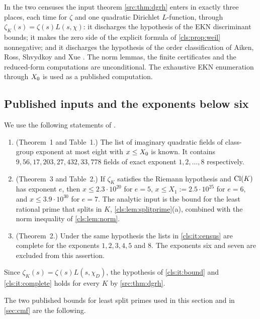 In the two censuses the input theorem \cref{src:thm:dgrh} enters in exactly three places,
each time for $\zeta$ and one quadratic Dirichlet $L$-function, through
$\zeta_K(s)=\zeta(s)L(s,\chi)$:
it discharges the hypothesis of the EKN discriminant bounds; it makes the zero side of the
explicit formula of \cref{cls:prop:weil} nonnegative; and it discharges the hypothesis of
the order classification of Aiken, Ross, Shvydkoy and Xue \cite{Aiken2026Boundary}. The
norm lemmas, the finite certificates and the reduced-form computations are unconditional.
The exhaustive EKN enumeration through $X_0$ is used as a published computation.

\subsection{Published inputs and the exponents below six}\label{cls:sec:inputs}

We use the following statements of \cite{Elsenhans2020Imaginary}.
\begin{enumerate}[label=\textup{(E\arabic*)}]
\item\label{cls:it:census} (Theorem~1 and Table~1.) The list of imaginary quadratic fields
of class-group exponent at most eight with $x\le X_0$ is known. It contains
$9,56,17,203,27,432,33,778$ fields of exact exponent $1,2,\dots,8$ respectively.
\item\label{cls:it:bound} (Theorem~3 and Table~2.) If $\zeta_K$ satisfies the Riemann
hypothesis and $\operatorname{Cl}(K)$ has exponent $e$, then $x\le2.3\cdot10^{20}$ for $e=5$,
$x\le X_1:=2.5\cdot10^{25}$ for $e=6$, and $x\le3.9\cdot10^{30}$ for $e=7$. The analytic
input is the bound for the least rational prime that splits in $K$,
\cref{cls:lem:splitprime}(a), combined with the norm inequality of \cref{cls:lem:norm}.
\item\label{cls:it:complete} (Theorem~2.) Under the same hypothesis the lists in
\ref{cls:it:census} are complete for the exponents $1,2,3,4,5$ and $8$. The exponents six
and seven are excluded from this assertion.
\end{enumerate}
Since $\zeta_K(s)=\zeta(s)L(s,\chi_D)$, the hypothesis of \ref{cls:it:bound} and
\ref{cls:it:complete} holds for every $K$ by \cref{src:thm:dgrh}.

The two published bounds for least split primes used in this section and in
\cref{sec:cmf} are the following.

